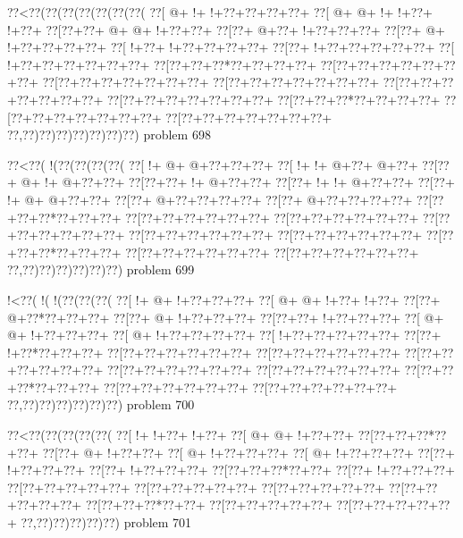 \vbox{\vbox{\goo
\0??<\0??(\0??(\0??(\0??(\0??(\0??(\0??(
\0??[\- @+\- !+\- !+\0??+\0??+\0??+\0??+
\0??[\- @+\- @+\- !+\- !+\0??+\- !+\0??+
\0??[\0??+\0??+\- @+\- @+\- !+\0??+\0??+
\0??[\0??+\- @+\0??+\- !+\0??+\0??+\0??+
\0??[\0??+\- @+\- !+\0??+\0??+\0??+\0??+
\0??[\- !+\0??+\- !+\0??+\0??+\0??+\0??+
\0??[\0??+\- !+\0??+\0??+\0??+\0??+\0??+
\0??[\- !+\0??+\0??+\0??+\0??+\0??+\0??+
\0??[\0??+\0??+\0??*\0??+\0??+\0??+\0??+
\0??[\0??+\0??+\0??+\0??+\0??+\0??+\0??+
\0??[\0??+\0??+\0??+\0??+\0??+\0??+\0??+
\0??[\0??+\0??+\0??+\0??+\0??+\0??+\0??+
\0??[\0??+\0??+\0??+\0??+\0??+\0??+\0??+
\0??[\0??+\0??+\0??+\0??+\0??+\0??+\0??+
\0??[\0??+\0??+\0??*\0??+\0??+\0??+\0??+
\0??[\0??+\0??+\0??+\0??+\0??+\0??+\0??+
\0??[\0??+\0??+\0??+\0??+\0??+\0??+\0??+
\0??,\0??)\0??)\0??)\0??)\0??)\0??)\0??)
}
\hfil problem 698\hfil\break
}

\vbox{\vbox{\goo
\0??<\0??(\- !(\0??(\0??(\0??(\0??(
\0??[\- !+\- @+\- @+\0??+\0??+\0??+
\0??[\- !+\- !+\- @+\0??+\- @+\0??+
\0??[\0??+\- @+\- !+\- @+\0??+\0??+
\0??[\0??+\0??+\- !+\- @+\0??+\0??+
\0??[\0??+\- !+\- !+\- @+\0??+\0??+
\0??[\0??+\- !+\- @+\- @+\0??+\0??+
\0??[\0??+\- @+\0??+\0??+\0??+\0??+
\0??[\0??+\- @+\0??+\0??+\0??+\0??+
\0??[\0??+\0??+\0??*\0??+\0??+\0??+
\0??[\0??+\0??+\0??+\0??+\0??+\0??+
\0??[\0??+\0??+\0??+\0??+\0??+\0??+
\0??[\0??+\0??+\0??+\0??+\0??+\0??+
\0??[\0??+\0??+\0??+\0??+\0??+\0??+
\0??[\0??+\0??+\0??+\0??+\0??+\0??+
\0??[\0??+\0??+\0??*\0??+\0??+\0??+
\0??[\0??+\0??+\0??+\0??+\0??+\0??+
\0??[\0??+\0??+\0??+\0??+\0??+\0??+
\0??,\0??)\0??)\0??)\0??)\0??)\0??)
}
\hfil problem 699\hfil\break
}

\vbox{\vbox{\goo
\- !<\0??(\- !(\- !(\0??(\0??(\0??(
\0??[\- !+\- @+\- !+\0??+\0??+\0??+
\0??[\- @+\- @+\- !+\0??+\- !+\0??+
\0??[\0??+\- @+\0??*\0??+\0??+\0??+
\0??[\0??+\- @+\- !+\0??+\0??+\0??+
\0??[\0??+\0??+\- !+\0??+\0??+\0??+
\0??[\- @+\- @+\- !+\0??+\0??+\0??+
\0??[\- @+\- !+\0??+\0??+\0??+\0??+
\0??[\- !+\0??+\0??+\0??+\0??+\0??+
\0??[\0??+\- !+\0??*\0??+\0??+\0??+
\0??[\0??+\0??+\0??+\0??+\0??+\0??+
\0??[\0??+\0??+\0??+\0??+\0??+\0??+
\0??[\0??+\0??+\0??+\0??+\0??+\0??+
\0??[\0??+\0??+\0??+\0??+\0??+\0??+
\0??[\0??+\0??+\0??+\0??+\0??+\0??+
\0??[\0??+\0??+\0??*\0??+\0??+\0??+
\0??[\0??+\0??+\0??+\0??+\0??+\0??+
\0??[\0??+\0??+\0??+\0??+\0??+\0??+
\0??,\0??)\0??)\0??)\0??)\0??)\0??)
}
\hfil problem 700\hfil\break
}

\vbox{\vbox{\goo
\0??<\0??(\0??(\0??(\0??(\0??(
\0??[\- !+\- !+\0??+\- !+\0??+
\0??[\- @+\- @+\- !+\0??+\0??+
\0??[\0??+\0??+\0??*\0??+\0??+
\0??[\0??+\- @+\- !+\0??+\0??+
\0??[\- @+\- !+\0??+\0??+\0??+
\0??[\- @+\- !+\0??+\0??+\0??+
\0??[\0??+\- !+\0??+\0??+\0??+
\0??[\0??+\- !+\0??+\0??+\0??+
\0??[\0??+\0??+\0??*\0??+\0??+
\0??[\0??+\- !+\0??+\0??+\0??+
\0??[\0??+\0??+\0??+\0??+\0??+
\0??[\0??+\0??+\0??+\0??+\0??+
\0??[\0??+\0??+\0??+\0??+\0??+
\0??[\0??+\0??+\0??+\0??+\0??+
\0??[\0??+\0??+\0??*\0??+\0??+
\0??[\0??+\0??+\0??+\0??+\0??+
\0??[\0??+\0??+\0??+\0??+\0??+
\0??,\0??)\0??)\0??)\0??)\0??)
}
\hfil problem 701\hfil\break
}

